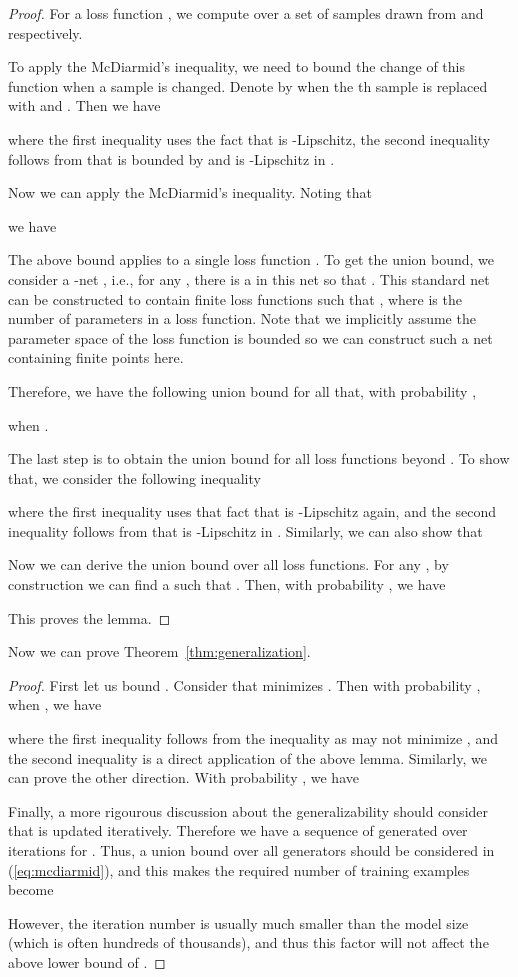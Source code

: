 \documentclass[11pt,fullpage, letterpaper,twoside]{article}
\newcommand{\1}[1]{\mathds{1}_{\left[#1\right]}}
\begin{document}
\begin{proof}
For a loss function , we compute  over a set of  samples  drawn from  and  respectively.

To apply the McDiarmid's inequality, we need to bound the change of this function when a sample is changed.  Denote by  when the th sample is replaced with  and . Then we have

where the first inequality uses the fact that  is -Lipschitz, the second inequality follows from that
 is bounded by  and  is -Lipschitz in .

Now we can apply the McDiarmid's inequality. Noting that

we have

The above bound applies to a single loss function .  To get the union bound, we consider a -net , i.e., for any , there is a  in this net so that . This standard net can be constructed to contain finite loss functions such that , where  is the number of parameters in a loss function. Note that we implicitly assume the parameter space of the loss function is bounded so we can construct such a net containing finite points here.

Therefore, we have the following union bound for all  that, with probability ,

when .

The last step is to obtain the union bound for all loss functions beyond . To show that, we consider the following inequality

where the first inequality uses that fact that  is -Lipschitz again, and the second inequality follows from that  is -Lipschitz in .
Similarly, we can also show that

Now we can derive the union bound over all loss functions. For any , by construction we can find a  such that .
Then, with probability , we have

This proves the lemma.
\end{proof}



Now we can prove Theorem~\ref{thm:generalization}.
\begin{proof}
First let us bound .  Consider  that minimizes . Then with probability , when , we have

where the first inequality follows from the inequality  as  may not minimize , and the second inequality is a direct application of the above lemma.
Similarly, we can prove the other direction. With probability , we have




Finally, a more rigourous discussion about the generalizability should consider that  is updated iteratively. Therefore we have a sequence of  generated over  iterations for .  Thus, a union bound over all generators should be considered in (\ref{eq:mcdiarmid}), and this makes the required number of training examples  become

However, the iteration number  is usually much smaller than the model size  (which is often hundreds of thousands), and thus this factor will not affect the above lower bound of .
\end{proof}
\end{document}
